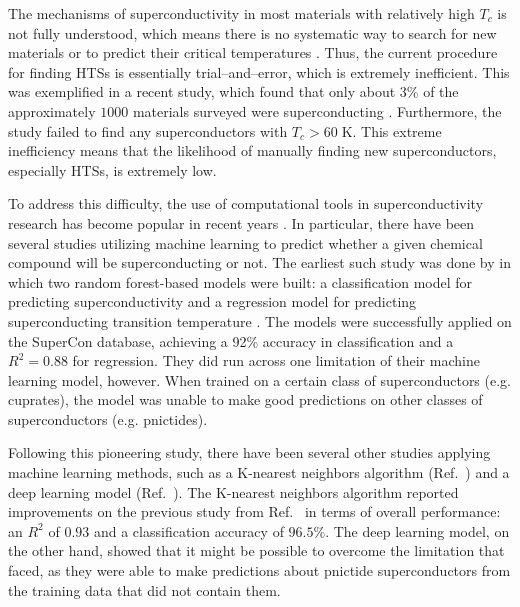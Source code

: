 The mechanisms of superconductivity in most materials with relatively high $T_c$ is not fully understood, which means there is no systematic way to search for new materials or to predict their critical temperatures \cite{HIRSCH20151}. Thus, the current procedure for finding HTSs is essentially trial--and--error, which is extremely inefficient. This was exemplified in a recent study, which found that only about $3\%$ of the approximately $1000$ materials surveyed were superconducting \cite{Hosono2015}. Furthermore, the study failed to find any superconductors with $T_c>60 \; \mathrm{K}$. This extreme inefficiency means that the likelihood of manually finding new superconductors, especially HTSs, is extremely low. 

To address this difficulty, the use of computational tools in superconductivity research has become popular in recent years \cite{Bedolla_2020}. In particular, there have been several studies utilizing machine learning to predict whether a given chemical compound will be superconducting or not. The earliest such study was done by \citeauthor{Stanev2018} in which two random forest-based models were built: a classification model for predicting superconductivity and a regression model for predicting superconducting transition temperature \cite{Stanev2018}. The models were successfully applied on the SuperCon database, achieving a 92\% accuracy in classification and a $R^2=0.88$ for regression. They did run across one limitation of their machine learning model, however. When trained on a certain class of superconductors (e.g. cuprates), the model was unable to make good predictions on other classes of superconductors (e.g. pnictides).

Following this pioneering study, there have been several other studies applying machine learning methods, such as a K-nearest neighbors algorithm (Ref.~\cite{ROTER20201353689}) and a deep learning model (Ref.~\cite{PhysRevB.103.014509}). The K-nearest neighbors algorithm reported improvements on the previous study from Ref.~\cite{Stanev2018} in terms of overall performance: an $R^2$ of $0.93$ and a classification accuracy of $96.5\%$. The deep learning model, on the other hand, showed that it might be possible to overcome the limitation that \citeauthor{Stanev2018} faced, as they were able to make predictions about pnictide superconductors from the training data that did not contain them.

